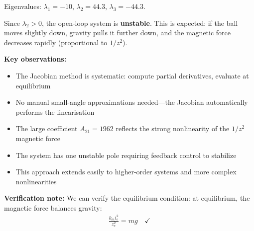 \documentclass[11pt,a4paper]{article}
\begin{document}
Eigenvalues: $\lambda_1 = -10$, $\lambda_2 = 44.3$, $\lambda_3 = -44.3$.

Since $\lambda_2 > 0$, the open-loop system is \textbf{unstable}. This is expected: if the ball moves slightly down, gravity pulls it further down, and the magnetic force decreases rapidly (proportional to $1/z^2$).

\textbf{Key observations:}
\begin{itemize}
  \item The Jacobian method is systematic: compute partial derivatives, evaluate at equilibrium
  \item No manual small-angle approximations needed---the Jacobian automatically performs the linearisation
  \item The large coefficient $A_{21} = 1962$ reflects the strong nonlinearity of the $1/z^2$ magnetic force
  \item The system has one unstable pole requiring feedback control to stabilize
  \item This approach extends easily to higher-order systems and more complex nonlinearities
\end{itemize}

\textbf{Verification note:} We can verify the equilibrium condition: at equilibrium, the magnetic force balances gravity:
\begin{align}
  \frac{k_m i_e^2}{z_e^2} = mg \quad \checkmark
\end{align}
\end{document}
